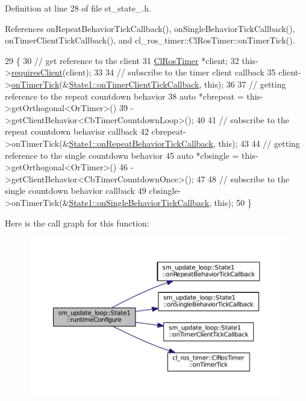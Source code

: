 Definition at line 28 of file st\+\_\+state\+\_.\+h.



References on\+Repeat\+Behavior\+Tick\+Callback(), on\+Single\+Behavior\+Tick\+Callback(), on\+Timer\+Client\+Tick\+Callback(), and cl\+\_\+ros\+\_\+timer\+::\+Cl\+Ros\+Timer\+::on\+Timer\+Tick().


\begin{DoxyCode}
29     \{
30         \textcolor{comment}{// get reference to the client}
31         \hyperlink{classcl__ros__timer_1_1ClRosTimer}{ClRosTimer} *client;
32         this->\hyperlink{classsmacc_1_1ISmaccState_a7f95c9f0a6ea2d6f18d1aec0519de4ac}{requiresClient}(client);
33 
34         \textcolor{comment}{// subscribe to the timer client callback}
35         client->\hyperlink{classcl__ros__timer_1_1ClRosTimer_a7edcc057bfb5a25fe0892755137dd8da}{onTimerTick}(&\hyperlink{structsm__update__loop_1_1State1_af132641f3167a2224249c70d072b6574}{State1::onTimerClientTickCallback},
       \textcolor{keyword}{this});
36 
37         \textcolor{comment}{// getting reference to the repeat countdown behavior}
38         \textcolor{keyword}{auto} *cbrepeat = this->getOrthogonal<OrTimer>()
39                              ->getClientBehavior<CbTimerCountdownLoop>();
40 
41         \textcolor{comment}{// subscribe to the repeat countdown behavior callback}
42         cbrepeat->onTimerTick(&\hyperlink{structsm__update__loop_1_1State1_aba8ce8c18482665237b1a5cb28deb657}{State1::onRepeatBehaviorTickCallback}, \textcolor{keyword}{
      this});
43 
44         \textcolor{comment}{// getting reference to the single countdown behavior}
45         \textcolor{keyword}{auto} *cbsingle = this->getOrthogonal<OrTimer>()
46                              ->getClientBehavior<CbTimerCountdownOnce>();
47 
48         \textcolor{comment}{// subscribe to the single countdown behavior callback}
49         cbsingle->onTimerTick(&\hyperlink{structsm__update__loop_1_1State1_ad15fb64f4f918c423038180d434d7220}{State1::onSingleBehaviorTickCallback}, \textcolor{keyword}{
      this});
50     \}
\end{DoxyCode}


Here is the call graph for this function\+:
\nopagebreak
\begin{figure}[H]
\begin{center}
\leavevmode
\includegraphics[width=350pt]{structsm__update__loop_1_1State1_a9a4c0a2a171bc9c2d7686562000075b4_cgraph}
\end{center}
\end{figure}


